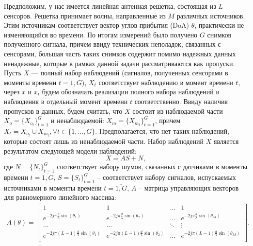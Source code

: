 \documentclass[11pt]{article}
\begin{document}
\begin{center}
\fontsize{20}{23}\selectfont {}
\end{center}
\begin{center}
\fontsize{16}{20}\selectfont {}
\end{center}
Предположим, у нас имеется линейная антенная решетка, состоящая из $L$ сенсоров. Решетка принимает волны, направленные из $M$ различных источников. Этим источникам соответствует вектор углов прибытия (DoA) $\theta$, практически не изменяющийся во времени. По итогам измерений было получено $G$ снимков полученного сигнала, причем ввиду технических неполадок, связанных с сенсорами, большая часть таких снимков содержит помимо надежных данных ненадежные, которые в рамках данной задачи рассматриваются как пропуски. Пусть $X$ --- полный набор наблюдений (сигналов, полученных сенсорами в моменты времени $t=\overline{1,G}$), $X_t$ соответствует наблюдению в момент времени $t$, через $x$ и $x_t$ будем обозначать реализации полного набора наблюдений и наблюдения в отдельный момент времени $t$  соответственно. Ввиду наличия пропусков в данных, будем считать, что $X$ состоит из наблюдаемой части $X_o = \{X_{o_t}\}_{t=1}^G$ и ненаблюдаемой: $X_m = \{X_{m_t}\}_{t=1}^G$, причем $X_t = X_{o_t} \cup X_{m_t}, \forall t \in \{1, ..., G\}$. Предполагается, что нет таких наблюдений, которые состоят лишь из ненаблюдаемой части. Набор наблюдений $X$ является результатом следующей модели наблюдений:
\begin{equation}
X = A S + N,
\end{equation}
где $N=\{N_t\}_{t=1}^G$ соответствует набору шумов, связанных с датчиками в моменты времени $t=\overline{1,G}$, $S=\{S_t\}_{t=1}^G$ -- соответствует набору сигналов, испускаемых источниками в моменты времени $t=\overline{1,G}$, $A$ -- матрица управляющих векторов для равномерного линейного массива:
\begin{gather}
A(\theta) = \begin{bmatrix}
1&1&\dots&1\\
e^{-2j\pi \frac{d}{\lambda}\sin(\theta_1)}& e^{-2j\pi \frac{d}{\lambda}\sin(\theta_2)}&\dots&e^{-2j\pi \frac{d}{\lambda}\sin(\theta_M)}\\
\dots&\dots&\ddots&\vdots\\
e^{-2j\pi (L-1) \frac{d}{\lambda}\sin(\theta_1)}& e^{-2j\pi (L-1) \frac{d}{\lambda}\sin(\theta_2)}&\dots&e^{-2j\pi (L-1) \frac{d}{\lambda}\sin(\theta_M)}\\
\end{bmatrix}.
\nonumber
\end{gather}
\end{document}
